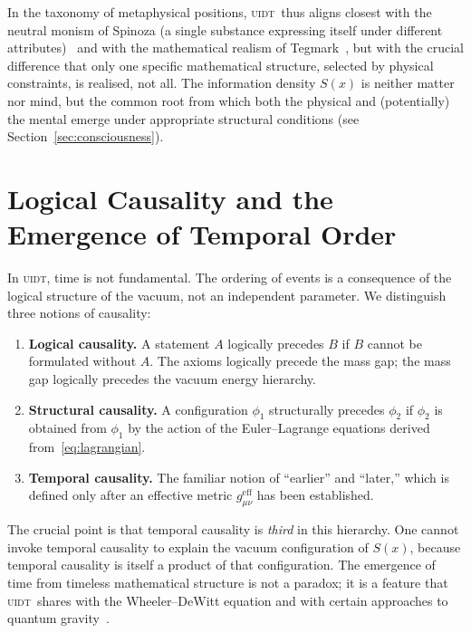 \documentclass[12pt,a4paper,twoside]{article}
\theoremstyle{plain}
\theoremstyle{definition}
\theoremstyle{remark}
\newcommand{\UIDT}{\textsc{uidt}}
\newcommand{\Sx}{S(x)}
\begin{document}
In the taxonomy of metaphysical positions, \UIDT\ thus aligns closest with
the neutral monism of Spinoza (a single substance expressing itself under
different attributes)~\cite{Spinoza1677} and with the mathematical realism of
Tegmark~\cite{Tegmark2008}, but with the crucial difference that only one
specific mathematical structure, selected by physical constraints, is
realised, not all. The information density $S(x)$ is neither matter nor mind,
but the common root from which both the physical and (potentially) the mental
emerge under appropriate structural conditions (see Section~\ref{sec:consciousness}).


\section{Logical Causality and the Emergence of Temporal Order}
\label{sec:causality}

In \UIDT, time is not fundamental. The ordering of events is a consequence of
the logical structure of the vacuum, not an independent parameter. We
distinguish three notions of causality:

\begin{enumerate}
  \item \textbf{Logical causality.} A statement $A$ logically precedes $B$ if
    $B$ cannot be formulated without $A$. The axioms logically precede the
    mass gap; the mass gap logically precedes the vacuum energy hierarchy.
  \item \textbf{Structural causality.} A configuration $\phi_1$ structurally
    precedes $\phi_2$ if $\phi_2$ is obtained from $\phi_1$ by the action of
    the Euler--Lagrange equations derived from~\eqref{eq:lagrangian}.
  \item \textbf{Temporal causality.} The familiar notion of ``earlier'' and
    ``later,'' which is defined only after an effective metric
    $g_{\mu\nu}^{\mathrm{eff}}$ has been established.
\end{enumerate}

The crucial point is that temporal causality is \emph{third} in this hierarchy.
One cannot invoke temporal causality to explain the vacuum configuration of
$\Sx$, because temporal causality is itself a product of that configuration.
The emergence of time from timeless mathematical structure is not a paradox; it
is a feature that \UIDT\ shares with the Wheeler--DeWitt equation and with
certain approaches to quantum gravity~\cite{Penrose2004}.
\end{document}
